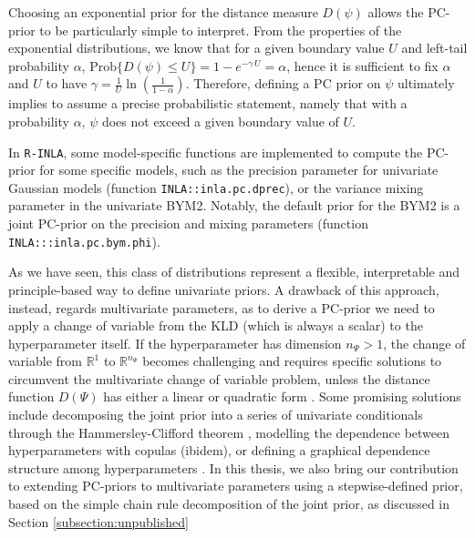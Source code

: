 \documentclass[openany, 11pt, oneside]{book}
\begin{document}
Choosing an exponential prior for the distance measure $D(\psi)$ allows the PC-prior to be particularly simple to interpret. From the properties of the exponential distributions, we know that for a given boundary value $U$ and left-tail probability $\alpha$, $\mathrm{Prob}\lbrace D(\psi)\leq U \rbrace = 1-e^{-\gamma \, U} = \alpha$, hence it is sufficient to fix $\alpha$ and $U$ to have $\gamma = \frac{1}{U}\ln \left(\frac{1}{1-\alpha}\right)$. Therefore, defining a PC prior on $\psi$ ultimately implies to assume a precise probabilistic statement, namely that with a probability $\alpha$, $\psi$ does not exceed a given boundary value of $U$.

In \texttt{R-INLA}, some model-specific functions are implemented to compute the PC-prior for some specific models, such as the precision parameter for univariate Gaussian models (function \texttt{INLA::inla.pc.dprec}), or the variance mixing parameter in the univariate BYM2. Notably, the default prior for the BYM2 is a joint PC-prior on the precision and mixing parameters (function \texttt{INLA:::inla.pc.bym.phi}). 

As we have seen, this class of distributions represent a flexible, interpretable and principle-based way to define univariate priors. A drawback of this approach, instead, regards multivariate parameters, as to derive a PC-prior we need to apply a change of variable from the KLD (which is always a scalar) to the hyperparameter itself. If the hyperparameter has dimension $n_\Psi>1$, the change of variable from $\mathbb{R}^1$ to $\mathbb{R}^{n_\Psi}$ becomes challenging and requires specific solutions to circumvent the multivariate change of variable problem, unless the distance function $D(\Psi)$ has either a linear or quadratic form \parencite{PC}. Some promising solutions include decomposing the joint prior into a series of univariate conditionals through the Hammersley-Clifford theorem \parencite{Battagliese2020}, modelling the dependence between hyperparameters with copulas (ibidem), or defining a graphical dependence structure among hyperparameters \parencite{Freni2025}. In this thesis, we also bring our contribution to extending PC-priors to multivariate parameters using a stepwise-defined prior, based on the simple chain rule decomposition of the joint prior, as discussed in Section \ref{subsection:unpublished}



 
\end{document}
